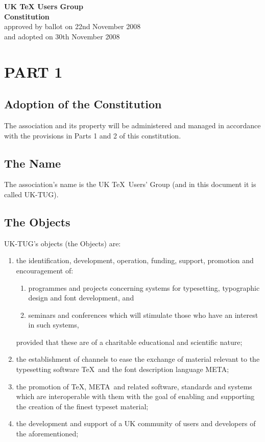\documentclass[a4paper,11pt]{article}
\newcommand{\MF}{{\manual META}\-{\manual FONT}}
\begin{document}
\begin{center}
\textbf{\Large{UK {\TeX} Users Group}} \\[3ex]
\textbf{Constitution} \\[2ex]
approved by ballot on 22nd November 2008 \\
and adopted on 30th November 2008
\end{center}
 
\vspace{2ex}
\section*{PART 1}

\subsection{Adoption of the Constitution}

The association and its property will be administered and managed in accordance
with the provisions in Parts 1 and 2 of this constitution.

\subsection{The Name}

The association's name is the UK \TeX\ Users’ Group (and in this document it
is called UK-TUG).

\subsection{The Objects}

UK-TUG's objects (the Objects) are:
\begin{enumerate}
\item the identification, development, operation, funding, support, promotion
  and encouragement of:
  \begin{enumerate}
  \item programmes and projects concerning systems for typesetting, typographic
   design and font development, and
  \item seminars and conferences which will stimulate those who have an 
   interest in such systems,
  \end{enumerate}
  provided that these are of a charitable educational and scientific nature;
\item the establishment of channels to ease the exchange of material relevant to
  the typesetting software \TeX\ and the font description language \MF;
\item the promotion of \TeX, \MF\ and related software, standards and systems
  which are interoperable with them with the goal of enabling and supporting the
  creation of the finest typeset material;
\item the development and support of a UK community of users and developers of
  the aforementioned;
\end{enumerate}
\end{document}
